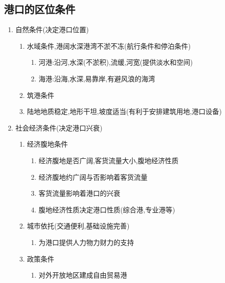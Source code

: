 \documentclass[a4paper]{article}
\begin{document}
    \subsection{港口的区位条件}
    \begin{enumerate}
        \item 自然条件(决定港口位置)
        \begin{enumerate}
            \item 水域条件,港阔水深港湾不淤不冻(航行条件和停泊条件)
            \begin{enumerate}
                \item 河港:沿河,水深(不淤积),流缓,河宽(提供淡水和空间)
                \item 海港:沿海,水深,易靠岸,有避风浪的海湾
            \end{enumerate}
            \item 筑港条件
            \item 陆地地质稳定,地形干坦,坡度适当(有利于安排建筑用地,港口设备)
        \end{enumerate}
        \item 社会经济条件(决定港口兴衰)
        \begin{enumerate}
            \item 经济腹地条件
            \begin{enumerate}
                \item 经济腹地是否广阔,客货流量大小,腹地经济性质
                \item 经济腹地约广阔与否影响着客货流量
                \item 客货流量影响着港口的兴衰
                \item 腹地经济性质决定港口性质(综合港,专业港等)
            \end{enumerate}
            \item 城市依托(交通便利,基础设施完善)
            \begin{enumerate}
                \item 为港口提供人力物力财力的支持
            \end{enumerate}
            \item 政策条件
            \begin{enumerate}
                \item 对外开放地区建成自由贸易港
            \end{enumerate}
        \end{enumerate}
    \end{enumerate}
\end{document}
